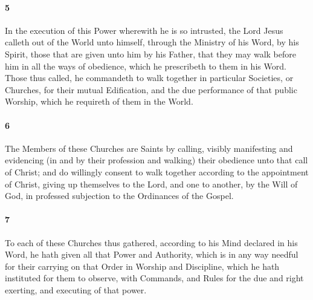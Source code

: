 \documentclass[
    paper=letterpaper,
    11pt,
    twoside,
    DIV=calc,
    openany
]{scrbook}
\newcommand{\ERRATA}[1]{}
\newcommand{\oldgrammar}[2]{#2}
\begin{document}
\footnotebegin
{}
\footnoteend

\paragraph{5} %
In the execution of this Power wherewith he is so intrusted, the Lord Jesus calleth out of the World unto himself, through the Ministry of his Word, by his Spirit, \R{}those that are given unto him by his Father, that they may walk before him in all the \R{}ways of obedience, which he prescribeth to them in his Word. Those thus called, he commandeth to walk together in particular Societies, or \R{}Churches, for their mutual Edification, and the due performance of that \oldgrammar{publick}{public} Worship, which he requireth of them in the World.

\footnotebegin
\ERRATA{:
1688 & 1719 & reni: John 12:32 on reference i
lbcw: John 12:32 on reference k
}
\footnoteend

\paragraph{6} %
The Members of these Churches are \R{}Saints by calling, visibly manifesting and evidencing (in and by their profession and walking) their obedience unto that call of Christ; and do willingly consent to walk together according to the appointment of Christ, giving up themselves to the Lord, and one to another, by the Will of God, \R{}in professed subjection to the Ordinances of the Gospel.

\footnotebegin
{}
\footnoteend

\paragraph{7} %
To each of these Churches thus gathered, according to his Mind declared in his Word, he hath given all that \R{}Power and Authority, which is in any way needful for their carrying on that Order in Worship and Discipline, which he hath instituted for them to observe, with Commands, and Rules for the due and right exerting, and executing of that power.

\footnotebegin
{}
\footnoteend
\end{document}

